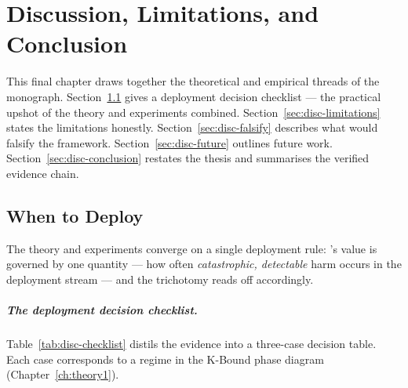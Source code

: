 \chapter{Discussion, Limitations, and Conclusion}\label{ch:discussion}

This final chapter draws together the theoretical and empirical threads of the
monograph.  Section~\ref{sec:disc-when} gives a deployment decision checklist
--- the practical upshot of the theory and experiments combined.
Section~\ref{sec:disc-limitations} states the limitations honestly.
Section~\ref{sec:disc-falsify} describes what would falsify the framework.
Section~\ref{sec:disc-future} outlines future work.
Section~\ref{sec:disc-conclusion} restates the thesis and summarises the
verified evidence chain.

\section{When to Deploy \KBound{}}\label{sec:disc-when}

The theory and experiments converge on a single deployment rule: \KBound{}'s
value is governed by one quantity --- how often \emph{catastrophic, detectable}
harm occurs in the deployment stream --- and the trichotomy reads off accordingly.

\paragraph{The deployment decision checklist.}

Table~\ref{tab:disc-checklist} distils the evidence into a three-case decision
table.  Each case corresponds to a regime in the K-Bound phase diagram
(Chapter~\ref{ch:theory1}).

